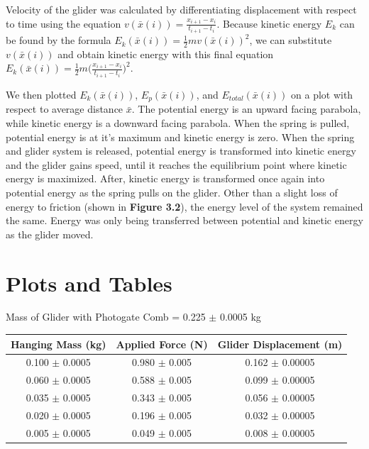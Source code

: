 \documentclass[11pt]{report}
\begin{document}
Velocity of the glider was calculated by differentiating displacement with respect to
time using the equation \(v(\bar{x}(i)) = \frac{x_{i+1} - x_i}{t_{i+1} - t_i}\).
Because kinetic energy \(E_k\) can be found by the formula \(E_k(\bar{x}(i)) =
\frac{1}{2}mv(\bar{x}(i))^2\), we can substitute \(v(\bar{x}(i))\) and obtain
kinetic energy with this final equation \(E_k(\bar{x}(i)) =
\frac{1}{2}m\Bigg(\frac{x_{i+1} - x_i}{t_{i+1} - t_i}\Bigg)^2\). 

We then plotted \(E_k(\bar{x}(i))\), \(E_p(\bar{x}(i))\), and
\(E_{total}(\bar{x}(i))\) on a
plot with respect to average distance $\bar{x}$.  The potential energy is an
upward facing parabola, while kinetic energy is a downward facing parabola.
When the spring is pulled, potential energy is at it's maximum and kinetic
energy is zero.  When the spring and glider system is released, potential energy
is transformed into kinetic energy and the glider gains speed, until it reaches
the equilibrium point where kinetic energy is maximized.  After, kinetic energy
is transformed once again into potential energy as the spring pulls on the
glider.  Other than a slight loss of energy to friction (shown in \textbf{Figure
3.2}), the energy level of the system remained the same.  Energy was only being
transferred between potential and kinetic energy as the glider moved.

\section*{Plots and Tables}
Mass of Glider with Photogate Comb = 0.225 $\pm$ 0.0005 kg
\begin{center}
    \begin{tabular}{| c | c | c |}
        \hline
        Hanging Mass (kg) & Applied Force (N) & Glider Displacement (m) \\
        \hline
        0.100 $\pm$ 0.0005 & 0.980 $\pm$ 0.005 & 0.162 $\pm$ 0.00005 \\
        \hline
        0.060 $\pm$ 0.0005 & 0.588 $\pm$ 0.005 & 0.099 $\pm$ 0.00005 \\
        \hline
        0.035 $\pm$ 0.0005 & 0.343 $\pm$ 0.005 & 0.056 $\pm$ 0.00005 \\
        \hline
        0.020 $\pm$ 0.0005 & 0.196 $\pm$ 0.005 & 0.032 $\pm$ 0.00005 \\
        \hline
        0.005 $\pm$ 0.0005 & 0.049 $\pm$ 0.005 & 0.008 $\pm$ 0.00005 \\
        \hline
    \end{tabular}
\end{center}
\end{document}
